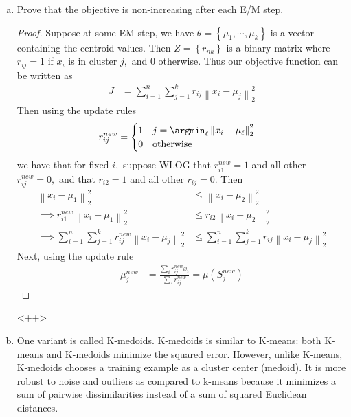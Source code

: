 \documentclass{article}
\begin{document}
\begin{enumerate}[(a)]
	\item Prove that the objective is non-increasing after each E/M step.
		\begin{proof}
			Suppose at some EM step, we have $\theta=\left\{ \mu_1, \cdots, \mu_k \right\}$ is a vector containing the centroid values. Then $Z=\left\{ r_{nk} \right\}$ is a binary matrix where $r_{ij}=1$ if $x_i$ is in cluster $j,$ and 0 otherwise. Thus our objective function can be written as
			\begin{align*}
				J &= \sum_{i=1}^{n} \sum_{j=1}^{k} r_{ij} \left\lVert x_i-\mu_j \right\rVert_2^2
			\end{align*}
			Then using the update rules
			\begin{align*}
				r_{ij}^{new} &= \begin{cases}
					1 & j=\argmin_{\ell} \left\lVert x_i-\mu_\ell \right\rVert_2^2 \\
					0 & \text{otherwise}
				\end{cases}
			\end{align*}
			we have that for fixed $i,$ suppose WLOG that $r_{i1}^{new}=1$ and all other $r_{ij}^{new}=0,$ and that $r_{i2}=1$ and all other $r_{ij}=0.$ Then
			\begin{align*}
				\left\lVert x_i-\mu_1 \right\rVert_2^2 &\le \left\lVert x_i-\mu_2 \right\rVert_2^2 \\ 
				\implies r_{i1}^{new}\left\lVert x_i-\mu_1 \right\rVert_2^2 &\le r_{i2}\left\lVert x_i-\mu_2 \right\rVert_2^2 \\
				\implies \sum_{i=1}^{n} \sum_{j=1}^{k} r_{ij}^{new} \left\lVert x_i-\mu_j \right\rVert_2^2&\le \sum_{i=1}^{n} \sum_{j=1}^{k} r_{ij} \left\lVert x_i-\mu_j \right\rVert_2^2
			\end{align*}
			Next, using the update rule
			\begin{align*}
				\mu_j^{new} &= \frac{\sum_{i}^{}r_{ij}^{new} x_i}{\sum_{i}^{}r_{ij}^{new}} = \mu(S_j^{new})
			\end{align*}
		\end{proof}<++>

	\item One variant is called K-medoids. K-medoids is similar to K-means: both K-means and K-medoids minimize the squared error. However, unlike K-means, K-medoids chooses a training example as a cluster center (medoid). It is more robust to noise and outliers as compared to k-means because it minimizes a sum of pairwise dissimilarities instead of a sum of squared Euclidean distances. 


\end{enumerate}
\end{document}

